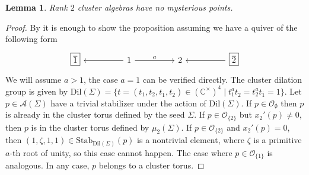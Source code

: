 \documentclass{amsart}
\newcommand{\seed}{\Sigma}
\newcommand{\var}{\mathcal{A}}
\newcommand{\Stab}{\mathrm{Stab}}
\newcommand{\C}{\mathbb{C}}
\numberwithin{equation}{section}
\newtheorem{lemma}[theorem]{Lemma}
\theoremstyle{definition}
\newcommand{\dil}{\mathrm{Dil}}
\begin{document}
\begin{lemma}\label{lem:rank2}
Rank $2$ cluster algebras have no mysterious points.
\end{lemma}
\begin{proof}
By \cite[Corollary 3.19]{deep} it is enough to show the proposition assuming we have a quiver of the following form
\[\begin{tikzcd}
	{\boxed{\overline{1}}} && 1 && 2 && {\boxed{\overline{2}}}
	\arrow[from=1-3, to=1-1]
	\arrow["a", from=1-3, to=1-5]
	\arrow[from=1-7, to=1-5]
\end{tikzcd}\]
We will assume $a > 1$, the case $a = 1$ can be verified directly. 
The cluster dilation group is given by $\dil(\seed) = \{t = (t_1, t_2, t_{\overline{1}}, t_{\overline{2}}) \in (\C^{\times})^{4} \mid t_1^{a}t_{\overline{2}} = t_2^{a}t_{\overline{1}} = 1\}$. Let $p \in \var(\seed)$ have a trivial stabilizer under the action of $\dil(\seed)$. If $p \in \mathcal{O}_{\emptyset}$ then $p$ is already in the cluster torus defined by the seed $\seed$. If $p \in \mathcal{O}_{\{2\}}$ but $x_2'(p) \neq 0$, then $p$ is in the cluster torus defined by $\mu_2(\seed)$. If $p \in \mathcal{O}_{\{2\}}$ and $x_2'(p) = 0$, then $(1, \zeta, 1, 1) \in \Stab_{\dil(\seed)}(p)$ is a nontrivial element, where $\zeta$ is a primitive $a$-th root of unity, so this case cannot happen. The case where $p \in \mathcal{O}_{\{1\}}$ is analogous. In any case, $p$ belongs to a cluster torus.
\end{proof}
\end{document}
